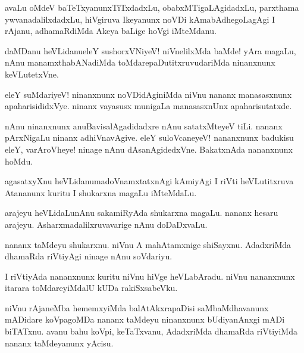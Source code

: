 \begin{mng}
avaLu oMdeV baTeTxyanunxTiTxdadxLu, obabxMTigaLAgidadxLu, parxthama ywvanadalilxdadxLu, hiVgiruva Ikeyanunx noVDi kAmabAdhegoLagAgi I rAjanu, adhamaRdiMda Akeya baLige hoVgi iMteMdanu.
\end{mng}

\begin{mng}
daMDanu heVLidanu\mdash eleY sushorxVNiyeV! niVnelilxMda baMde! yAra magaLu, nAnu manamxthabANadiMda toMdarepaDutitxruvudariMda ninanxnunx keVLutetxVne.
\end{mng}

\begin{mng}
eleY suMdariyeV! ninanxnunx noVDidAginiMda niVnu nananx manasasxnunx apaharisididxVye. ninanx vayasusx munigaLa manasasxnUnx apaharisutatxde.
\end{mng}

\begin{mng}
nAnu ninanxnunx anuBavisalAgadidadxre nAnu satatxMteyeV tiLi. nananx pArxNigaLu ninanx adhiVnavAgive. eleY suloVcaneyeV! nananxnunx badukisu eleY, varAroVheye! ninage nAnu dAsanAgidedxVne. BakatxnAda nananxnunx hoMdu.
\end{mng}

\begin{mng}
agasatxyXnu heVLidanu\mdash madoVnamxtatxnAgi kAmiyAgi I riVti heVLutitxruva Atananunx kuritu I shukarxna magaLu iMteMdaLu.
\end{mng}

\begin{mng}
arajeyu heVLidaLu\mdash nAnu sakamiRyAda shukarxna magaLu. nananx hesaru arajeyu. Asharxmadalilxruvavarige nAnu doDaDxvaLu.
\end{mng}

\begin{mng}
nananx taMdeyu shukarxnu. niVnu A mahAtamxnige shiSayxnu. AdadxriMda dhamaRda riVtiyAgi ninage nAnu soVdariyu.
\end{mng}

\begin{mng}
I riVtiyAda nananxnunx kuritu niVnu hiVge heVLabAradu. niVnu nananxnunx itarara toMdareyiMdalU kUDa rakiSxsabeVku.
\end{mng}

\begin{mng}
niVnu rAjaneMba hememxyiMda balAtAkxrapaDisi saMbaMdhavanunx mADidare koVpagoMDa nananx taMdeyu ninanxnunx bUdiyanAnxgi mADi biTATxnu. avanu bahu koVpi, keTaTxvanu, AdadxriMda dhamaRda riVtiyiMda nananx taMdeyanunx yAcisu.
\end{mng}

